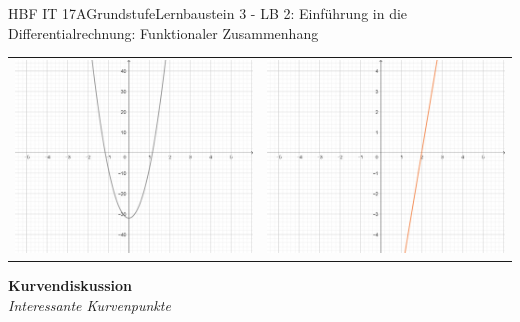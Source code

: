 \documentclass[oneside,openany,headings=optiontotoc,11pt,numbers=noenddot]{scrreprt}
\begin{document}
\begin{worksheet}{HBF IT 17A}{Grundstufe}{Lernbaustein 3 - LB 2: Einführung in die Differentialrechnung: Funktionaler Zusammenhang}
\begin{framed}
\begin{tabularx}{\textwidth}{X|X}
				\includegraphics[scale=0.3]{Bilder/fktZusammenhf''.jpg} & \includegraphics[scale=0.3]{Bilder/fktZusammenhg''.jpg}\\
			\end{tabularx}
		\end{framed}
		\begin{framed}
			\begin{center}
				\textbf{Kurvendiskussion}\\
				\textit{Interessante Kurvenpunkte}
			\end{center}
			\raggedright

\end{framed}
\end{worksheet}
\end{document}
